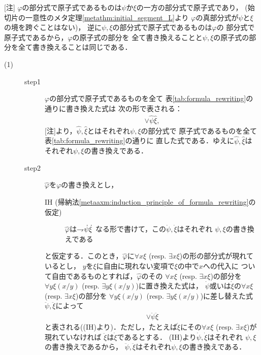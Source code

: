 	\begin{metaprf}\mbox{}
		[注] $\varphi$の部分式で原子式であるものは$\psi$か$\xi$の一方の部分式で原子式であり，
		(始切片の一意性のメタ定理\ref{metathm:initial_segment_L}より
		$\varphi$の真部分式が$\psi$と$\xi$の境を跨ぐことはない)，
		逆に$\psi,\xi$の部分式で原子式であるものは$\varphi$の
		部分式で原子式であるから，$\varphi$の原子式の部分を
		全て書き換えることと$\psi,\xi$の原子式の部分を全て書き換えることは同じである．
		\begin{description}
			\item[(1)] 
				\begin{description}
					\item[step1]
						$\varphi$の部分式で原子式であるものを全て
						表\ref{tab:formula_rewriting}の通りに書き換えた式は
						次の形で表される：
						\begin{align}
							\vee \hat{\psi} \hat{\xi},
						\end{align}
						[注]より，$\hat{\psi},\hat{\xi}$とはそれぞれ$\psi,\xi$の部分式で
						原子式であるものを全て表\ref{tab:formula_rewriting}の通りに
						直した式である．ゆえに$\hat{\psi},\hat{\xi}$は
						それぞれ$\psi,\xi$の書き換えである．
						
					\item[step2]
						$\widehat{\varphi}$を$\varphi$の書き換えとし，
						\begin{description}
							\item[IH (帰納法\ref{metaaxm:induction_principle_of_formula_rewriting}の仮定)]
								$\widehat{\varphi}$は$\rightharpoondown\hspace{-0.25em} \dot{\psi} \dot{\xi}$
								なる形で書けて，この$\dot{\psi},\dot{\xi}$はそれぞれ
								$\psi,\xi$の書き換えである
						\end{description}
						と仮定する．このとき，$\widehat{\varphi}$に$\forall x \xi$ 
						(resp. $\exists x \xi$)の形の部分式が現れているとし，
						$y$を$\xi$に自由に現れない変項で$\xi$の中で$x$への代入に
						ついて自由であるものとすれば，$\widehat{\varphi}$のその
						$\forall x \xi$ (resp. $\exists x \xi$)の部分を
						$\forall y \xi(x/y)$
						(resp. $\exists y \xi(x/y)$)に置き換えた式は，
						$\dot{\psi}$或いは$\dot{\xi}$の$\forall x \xi$
						(resp. $\exists x \xi$)の部分を
						$\forall y \xi(x/y)$
						(resp. $\exists y \xi(x/y)$)に差し替えた式
						$\ddot{\psi},\ddot{\xi}$によって
						\begin{align}
							\vee \ddot{\psi} \ddot{\xi}
						\end{align}
						と表される((IH)より)．ただし，たとえば$\dot{\xi}$にその$\forall x \xi$
						(resp. $\exists x \xi$)が現れていなければ
						$\ddot{\xi}$は$\dot{\xi}$であるとする．
						(IH)より$\dot{\psi},\dot{\xi}$はそれぞれ
						$\psi,\xi$の書き換えであるから，
						$\ddot{\psi},\ddot{\xi}$はそれぞれ$\psi,\xi$の書き換えである．
				\end{description}
				

\end{description}
\end{metaprf}
